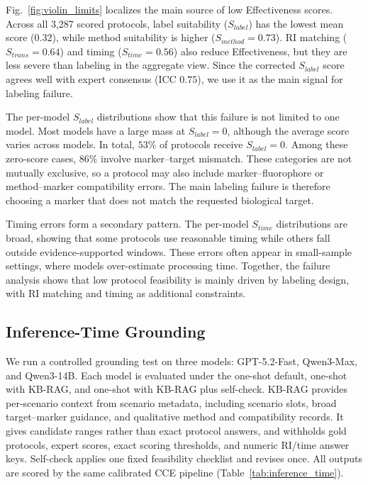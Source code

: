 \documentclass[conference]{IEEEtran}
\begin{document}
Fig.~\ref{fig:violin_limits} localizes the main source of low Effectiveness
scores. Across all 3{,}287 scored protocols, label suitability ($S_{label}$)
has the lowest mean score ($0.32$), while method suitability is higher
($S_{method}=0.73$). RI matching ($S_{trans}=0.64$) and timing
($S_{time}=0.56$) also reduce Effectiveness, but they are less severe than
labeling in the aggregate view. Since the corrected $S_{label}$ score agrees
well with expert consensus (ICC $0.75$), we use it as the main signal for
labeling failure.

The per-model $S_{label}$ distributions show that this failure is not limited
to one model. Most models have a large mass at $S_{label}=0$, although the
average score varies across models. In total, $53\%$ of protocols receive
$S_{label}=0$. Among these zero-score cases, $86\%$ involve marker--target
mismatch. These categories are not mutually exclusive, so a protocol may also
include marker--fluorophore or method--marker compatibility errors. The main
labeling failure is therefore choosing a marker that does not match the
requested biological target.

Timing errors form a secondary pattern. The per-model $S_{time}$ distributions
are broad, showing that some protocols use reasonable timing while others fall
outside evidence-supported windows. These errors often appear in small-sample
settings, where models over-estimate processing time. Together, the failure
analysis shows that low protocol feasibility is mainly driven by labeling
design, with RI matching and timing as additional constraints.

\subsection{Inference-Time Grounding}\label{sec:baselines}

We run a controlled grounding test on three models: GPT-5.2-Fast, Qwen3-Max,
and Qwen3-14B. Each model is evaluated under the one-shot default, one-shot with
KB-RAG, and one-shot with KB-RAG plus self-check. KB-RAG provides per-scenario
context from scenario metadata, including scenario slots, broad target--marker
guidance, and qualitative method and compatibility records. It gives candidate
ranges rather than exact protocol answers, and withholds gold protocols, expert
scores, exact scoring thresholds, and numeric RI/time answer keys. Self-check
applies one fixed feasibility checklist and revises once. All outputs are
scored by the same calibrated CCE pipeline (Table~\ref{tab:inference_time}).
\end{document}
